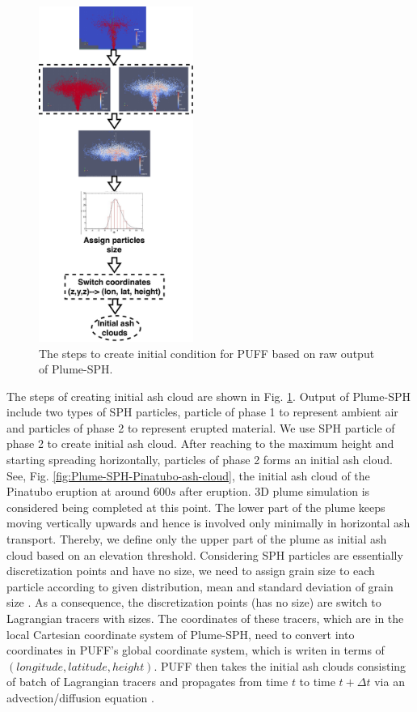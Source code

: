 \begin{figure}
\center
\includegraphics[width=0.45\textwidth]{./PPT/Creat_initial_Ash}
\caption{The steps to create initial condition for PUFF based on raw output of Plume-SPH.}
\label{fig:create-initial-ash-plume-sph}
\end{figure}
The steps of creating initial ash cloud are shown in Fig. \ref{fig:create-initial-ash-plume-sph}.
Output of Plume-SPH include two types of SPH particles, particle of phase 1 to represent ambient air and particles of phase 2 to represent erupted material. We use SPH particle of phase 2 to create initial ash cloud. After reaching to the maximum height and starting spreading horizontally, particles of phase 2 forms an initial ash cloud. See, Fig. \ref{fig:Plume-SPH-Pinatubo-ash-cloud}, the initial ash cloud of the Pinatubo eruption at around $600s$ after eruption. 3D plume simulation is considered being completed at this point. The lower part of the plume keeps moving vertically upwards and hence is involved only minimally in horizontal ash transport. Thereby, we define only the upper part of the plume as initial ash cloud based on an elevation threshold. Considering SPH particles are essentially discretization points and have no size, we need to assign grain size to each particle according to given distribution, mean and standard deviation of grain size \citep{paladio1996tephra}. As a consequence, the discretization points (has no size) are switch to Lagrangian tracers with sizes. The coordinates of these tracers, which are in the local Cartesian coordinate system of Plume-SPH, need to convert into coordinates in PUFF's global coordinate system, which is writen in terms of $(longitude, latitude, height)$. PUFF then takes the initial ash clouds consisting of batch of Lagrangian tracers and propagates from time $t$ to time $t+\Delta t$ via an advection/diffusion equation \citep{searcy1998puff}.
